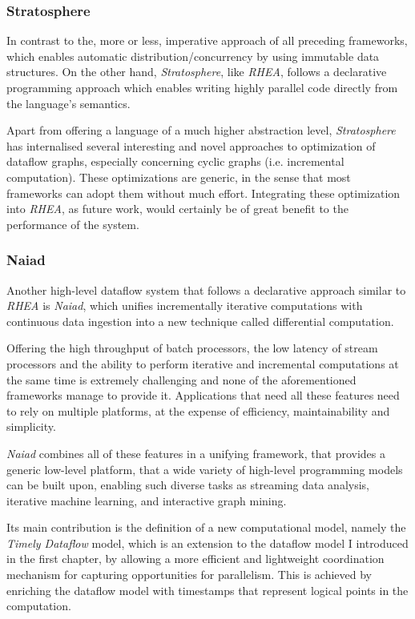 \documentclass[sigplan,review,anonymous]{acmart}\settopmatter{printfolios=true}
\begin{document}
\subsubsection{Stratosphere}

In contrast to the, more or less, imperative approach of all preceding frameworks, which enables automatic distribution/concurrency by using immutable data structures. On the other hand, \textit{Stratosphere}\cite{stratosphere}, like \textit{RHEA}, follows a declarative programming approach which enables writing highly parallel code directly from the language's semantics. 

Apart from offering a language of a much higher abstraction level, \textit{Stratosphere} has internalised several interesting and novel approaches to optimization of dataflow graphs, especially concerning cyclic graphs (i.e. incremental computation)\cite{spinning}. These optimizations are generic, in the sense that most frameworks can adopt them without much effort. Integrating these optimization into \textit{RHEA}, as future work, would certainly be of great benefit to the performance of the system.

\subsubsection{Naiad}

Another high-level dataflow system that follows a declarative approach similar to \textit{RHEA} is \textit{Naiad}, which unifies incrementally iterative computations with continuous data ingestion into a new
technique called differential computation.

Offering the high throughput of batch processors, the low latency of stream processors and the ability to perform iterative and incremental computations at the same time is extremely challenging and none of the aforementioned frameworks manage to provide it. Applications that need all these features need to rely on multiple platforms, at the expense of efficiency, maintainability and simplicity.

\textit{Naiad}\cite{naiad} combines all of these features in a unifying framework, that provides a generic low-level platform, that a wide variety of high-level programming models can be built upon, enabling such diverse tasks as streaming data analysis, iterative machine learning, and interactive graph mining.

Its main contribution is the definition of a new computational model, namely the \textit{Timely Dataflow} model, which is an extension to the dataflow model I introduced in the first chapter, by allowing a more efficient and lightweight coordination mechanism for capturing opportunities for parallelism. This is achieved by enriching the dataflow model with timestamps that represent logical points in the computation.
\end{document}
